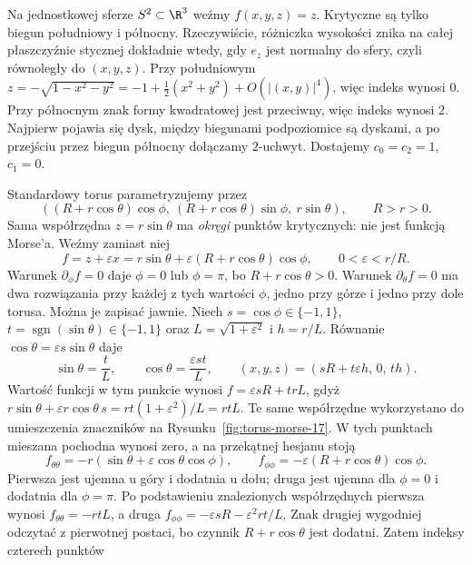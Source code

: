 \begin{przyklad}
\label{prz:morse-sfera-17}
Na jednostkowej sferze $S^2\subset\R^3$
weźmy $f(x,y,z)=z$. Krytyczne są
tylko biegun południowy i północny.
Rzeczywiście, różniczka wysokości znika na całej płaszczyźnie
stycznej dokładnie wtedy, gdy $e_z$ jest normalny do sfery,
czyli równoległy do $(x,y,z)$.
Przy południowym
$z=-\sqrt{1-x^2-y^2}
 =-1+\tfrac12(x^2+y^2)+O(|(x,y)|^4)$,
więc indeks wynosi $0$.
Przy północnym znak formy
kwadratowej jest przeciwny,
więc indeks wynosi $2$.
Najpierw pojawia się dysk,
między biegunami podpoziomice
są dyskami, a po przejściu przez
biegun północny dołączamy
$2$-uchwyt. Dostajemy
$c_0=c_2=1$, $c_1=0$.
\end{przyklad}

\begin{przyklad}
\label{prz:morse-torus-17}
Standardowy torus parametryzujemy przez
\[
 ((R+r\cos\theta)\cos\phi,\
  (R+r\cos\theta)\sin\phi,\
  r\sin\theta),\qquad R>r>0.
\]
Sama współrzędna $z=r\sin\theta$
ma \emph{okręgi} punktów krytycznych:
nie jest funkcją Morse'a.
Weźmy zamiast niej
\[
 f=z+\varepsilon x
 =r\sin\theta+
    \varepsilon(R+r\cos\theta)\cos\phi,
 \qquad 0<\varepsilon<r/R.
\]
Warunek $\partial_\phi f=0$ daje
$\phi=0$ lub $\phi=\pi$, bo
$R+r\cos\theta>0$.
Warunek $\partial_\theta f=0$ ma
dwa rozwiązania przy każdej z tych
wartości $\phi$, jedno przy górze
i jedno przy dole torusa.
Można je zapisać jawnie. Niech $s=\cos\phi\in\{-1,1\}$,
$t=\operatorname{sgn}(\sin\theta)\in\{-1,1\}$ oraz
$L=\sqrt{1+\varepsilon^2}$ i $h=r/L$.
Równanie $\cos\theta=\varepsilon s\sin\theta$ daje
\[
 \sin\theta=\frac{t}{L},\qquad
 \cos\theta=\frac{\varepsilon st}{L},\qquad
 (x,y,z)=(sR+t\varepsilon h,\,0,\,th).
\]
Wartość funkcji w tym punkcie wynosi
$f=\varepsilon sR+trL$, gdyż
$r\sin\theta+\varepsilon r\cos\theta\,s
=rt(1+\varepsilon^2)/L=rtL$.
Te same współrzędne wykorzystano
do umieszczenia znaczników na Rysunku~\ref{fig:torus-morse-17}.
W tych punktach mieszana pochodna
wynosi zero, a na przekątnej hesjanu
stoją
\[
 f_{\theta\theta}
  =-r(\sin\theta+
       \varepsilon\cos\theta\cos\phi),
 \qquad
 f_{\phi\phi}
  =-\varepsilon(R+r\cos\theta)\cos\phi.
\]
Pierwsza jest ujemna u góry
i dodatnia u dołu; druga jest
ujemna dla $\phi=0$
i dodatnia dla $\phi=\pi$.
Po podstawieniu znalezionych współrzędnych pierwsza wynosi
$f_{\theta\theta}=-rtL$, a druga
$f_{\phi\phi}=-\varepsilon sR-\varepsilon^2rt/L$.
Znak drugiej wygodniej odczytać z pierwotnej postaci,
bo czynnik $R+r\cos\theta$ jest dodatni.
Zatem indeksy czterech punktów

\end{przyklad}
